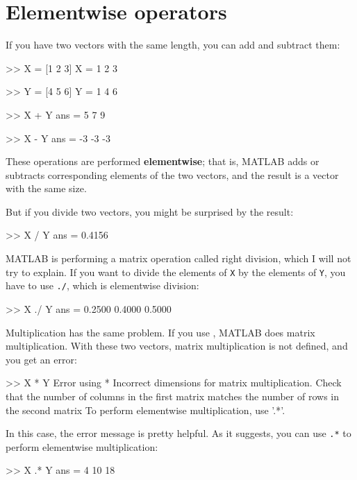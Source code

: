 \documentclass[
]{book}
\numberwithin{Answer}{chapter}
\numberwithin{Exercise}{chapter}
\begin{document}
\section{Elementwise operators}
\label{elementwise}

If you have two vectors with the same length, you can add and subtract them:

\begin{code}
>> X = [1 2 3]
X = 1     2     3

>> Y = [4 5 6]
Y = 1     4     6

>> X + Y
ans = 5     7     9

>> X - Y
ans = -3    -3    -3
\end{code}

These operations are performed {\bf elementwise}; that is, MATLAB adds or subtracts corresponding elements of the two vectors, and the result is a vector with the same size.

But if you divide two vectors, you might be surprised by the result:

\begin{code}
>> X / Y
ans = 0.4156
\end{code}

MATLAB is performing a matrix operation called right division, which I will not try to explain.  If you want to divide the elements of {\tt X} by the elements of {\tt Y}, you have to use {\tt ./}, which is elementwise division:

\begin{code}
>> X ./ Y
ans = 0.2500    0.4000    0.5000
\end{code}

Multiplication has the same problem.  If you use {\tt *}, MATLAB does matrix multiplication.  With these two vectors, matrix multiplication is not defined, and you get an error:

\begin{code}
>> X * Y
Error using  * 
Incorrect dimensions for matrix multiplication. 
Check that the number of columns in the first matrix 
matches the number of rows in the second matrix
To perform elementwise multiplication, use '.*'.
\end{code}

In this case, the error message is pretty helpful.  As it suggests, you can use {\tt .*} to perform elementwise multiplication:

\begin{code}
>> X .* Y
ans = 4    10    18
\end{code}
\end{document}
